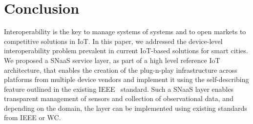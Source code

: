 \documentclass[conference]{IEEEtran}
\begin{document}
\section{Conclusion}
Interoperability is the key to manage systems of systems and to open markets to competitive solutions in IoT.
In this paper, we addressed the device-level interoperability problem prevalent in current IoT-based solutions for smart cities.
We proposed a SNaaS service layer, as part of a high level reference IoT architecture, that enables the creation of the plug-n-play infrastructure across platforms from multiple device vendors and implement it using the self-describing feature outlined in the existing IEEE~ standard.
Such a SNaaS layer enables transparent management of sensors and collection of observational data, and depending on the domain, the layer can be implemented using existing standards from IEEE or WC.


 
\end{document}
